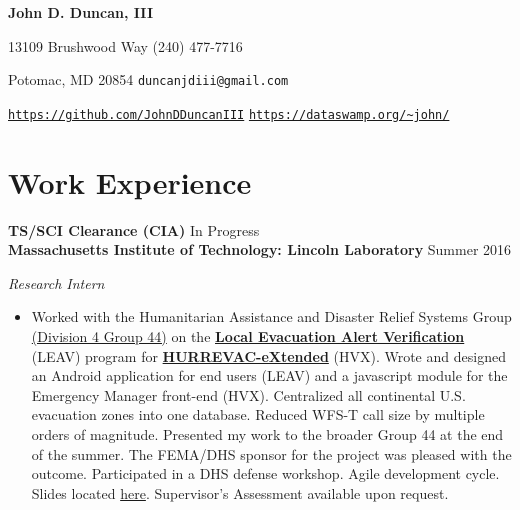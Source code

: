 \documentclass[11pt]{article}
\begin{document}
\fancyfoot{}
\pagestyle{fancy}
\thispagestyle{empty}
\renewcommand{\headrulewidth}{0pt}
\begin{center}
	{\huge \textbf{John D. Duncan, III}}
\end{center}
13109 Brushwood Way
\hfill
(240) 477-7716

Potomac, MD 20854
\hfill
\texttt{duncanjdiii@gmail.com}

\texttt{\url{https://github.com/JohnDDuncanIII}}
\hfill
\texttt{\url{https://dataswamp.org/~john/}}

\section*{Work Experience}
\textbf{TS/SCI Clearance (CIA)}
\hfill
In Progress\\


\textbf{Massachusetts Institute of Technology: Lincoln Laboratory}
\hfill
Summer 2016

\textit{Research Intern}

\begin{itemize}
\item[] Worked with the Humanitarian Assistance and Disaster Relief Systems Group \href{https://www.ll.mit.edu/employment/division4.html#gp44}{(Division 4 Group 44)} on the \href{https://www.dhs.gov/publication/national-hurricane-program-technology-modernization-local-evacuation-alert-verification}{\textbf{Local Evacuation Alert Verification}} (LEAV) program for \href{https://www.dhs.gov/publication/national-hurricane-program-technology-modernization-hurrevac-extended-hv-x}{\textbf{HURREVAC-eXtended}} (HVX). Wrote and designed an Android application for end users (LEAV) and a javascript module for the Emergency Manager front-end (HVX). Centralized all continental U.S. evacuation zones into one database. Reduced WFS-T call size by multiple orders of magnitude. Presented my work to the broader Group 44 at the end of the summer. The FEMA/DHS sponsor for the project was pleased with the outcome. Participated in a DHS defense workshop. Agile development cycle. Slides located \href{https://docs.google.com/presentation/d/1d6u7eK2fBJElrRpEn1KlkTfReKO_tHj5iCAGb6vgtmg/}{here}. Supervisor's Assessment available upon request. \\
\end{itemize}
\end{document}
